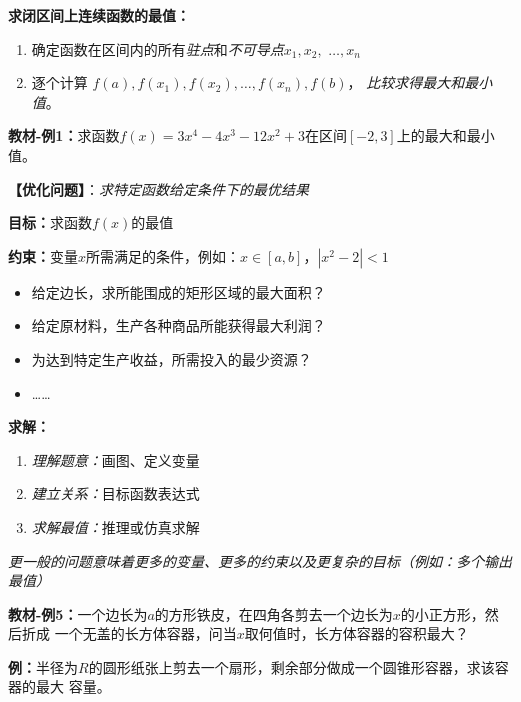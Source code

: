 \begin{center}
\end{center}

{\bf 求闭区间上连续函数的最值：}

\begin{enumerate}[(1)]
  \setlength{\itemindent}{1cm}
  \item 确定函数在区间内的所有{\it 驻点}和{\it 不可导点}$x_1,x_2,$ $\ldots,x_n$ 
  \item 逐个计算
  $f(a),f(x_1),f(x_2),\ldots,f(x_n),f(b)$，
  {\it 比较求得最大和最小值}。
\end{enumerate}

{\bf 教材-例1：}求函数$f(x)=3x^4-4x^3-12x^2+3$在区间$[-2,3]$上的最大和最小值。

\begin{shaded}
	{\bf 【优化问题】}：{\it 求特定函数给定条件下的最优结果}
	
	{\bf 目标：}求函数$f(x)$的最值
	
	{\bf 约束：}变量$x$所需满足的条件，例如：$x\in[a,b]$，$|x^2-2|<1$
	
	\begin{itemize}
	  \setlength{\itemindent}{1cm}
	  \item 给定边长，求所能围成的矩形区域的最大面积？
	  \item 给定原材料，生产各种商品所能获得最大利润？
	  \item 为达到特定生产收益，所需投入的最少资源？
	  \item \ldots \ldots
	\end{itemize}
	
	{\bf 求解：}
	\begin{enumerate}[(1)]
	  \setlength{\itemindent}{1cm}
	  \item {\it 理解题意：}画图、定义变量
	  \item {\it 建立关系：}目标函数表达式
	  \item {\it 求解最值：}推理或仿真求解
	\end{enumerate}
	
	{\it 更一般的问题意味着更多的变量、更多的约束以及更复杂的目标（例如：多个输出最值）}
\end{shaded}

{\bf 教材-例5：}一个边长为$a$的方形铁皮，在四角各剪去一个边长为$x$的小正方形，然后折成
一个无盖的长方体容器，问当$x$取何值时，长方体容器的容积最大？

{\bf 例：}半径为$R$的圆形纸张上剪去一个扇形，剩余部分做成一个圆锥形容器，求该容器的最大
容量。

